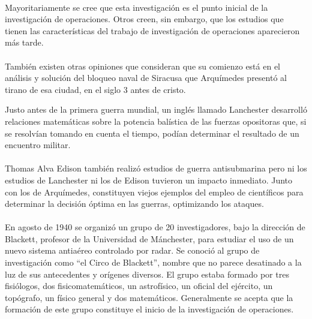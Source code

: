\documentclass[12pt, a4paper,spanish]{article}
\begin{document}
		\paragraph{}
		Mayoritariamente se cree que esta investigación es el punto inicial de la investigación de operaciones. Otros creen, sin embargo, que los estudios que tienen las características del trabajo de investigación de operaciones aparecieron más tarde.\cite{wikipedia_IO}

		\paragraph{}
		También existen otras opiniones que consideran que su comienzo está en el análisis y solución del bloqueo naval de Siracusa que Arquímedes presentó al tirano de esa ciudad, en el siglo 3 antes de cristo.\cite{wikipedia_IO}


		Justo antes de la primera guerra mundial, un inglés llamado Lanchester desarrolló relaciones matemáticas sobre la potencia balística de las fuerzas opositoras que, si se resolvían tomando en cuenta el tiempo, podían determinar el resultado de un encuentro militar.\cite{wikipedia_IO}

		\paragraph{}
		Thomas Alva Edison también realizó estudios de guerra antisubmarina pero ni los estudios de Lanchester ni los de Edison tuvieron un impacto inmediato. Junto con los de Arquímedes, constituyen viejos ejemplos del empleo de científicos para determinar la decisión óptima en las guerras, optimizando los ataques. \cite{wikipedia_IO}

		\paragraph{}
		En agosto de 1940 se organizó un grupo de 20 investigadores, bajo la dirección de Blackett, profesor de la Universidad de Mánchester, para estudiar el uso de un nuevo sistema antiaéreo controlado por radar. Se conoció al grupo de investigación como “el Circo de Blackett”, nombre que no parece desatinado a la luz de sus antecedentes y orígenes diversos. El grupo estaba formado por tres fisiólogos, dos fisicomatemáticos, un astrofísico, un oficial del ejército, un topógrafo, un físico general y dos matemáticos. Generalmente se acepta que la formación de este grupo constituye el inicio de la investigación de operaciones. \cite{wikipedia_IO}
\end{document}
